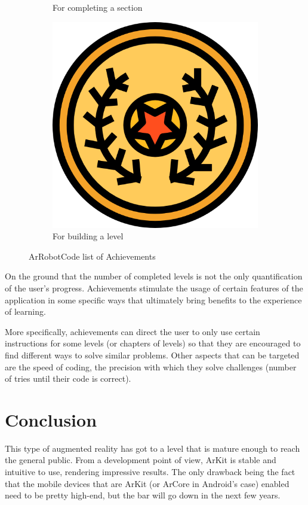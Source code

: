 \documentclass[12 pct]{report}
\begin{document}
\begin{figure}[H]
\begin{subfigure}[b]{0.3\linewidth}
    \caption{For completing a section }
  \end{subfigure}
  \begin{subfigure}[b]{0.3\linewidth}
    \includegraphics[width=\linewidth]{ArRobotCodeAchiv4}
    \caption{For building a level}
  \end{subfigure}
  \caption{ ArRobotCode list of Achievements}
  \label{fig:coffee3}
\end{figure}

On the ground that the number of completed levels is not the only quantification of the user's progress. Achievements stimulate the usage of certain features of the application in some specific ways that ultimately bring benefits to the experience of learning.

More specifically, achievements can direct the user to only use certain instructions for some levels (or chapters of levels) so that they are encouraged to find different ways to solve similar problems. Other aspects that can be targeted are the speed of coding, the precision with which they solve challenges (number of tries until their code is correct).

\section{Conclusion}
This type of augmented reality has got to a level that is mature enough to reach the general public. From a development point of view, ArKit is stable and intuitive to use, rendering impressive results. The only drawback being the fact that the mobile devices that are ArKit (or ArCore in Android's case) enabled need to be pretty high-end, but the bar will go down in the next few years. 
\end{document}
